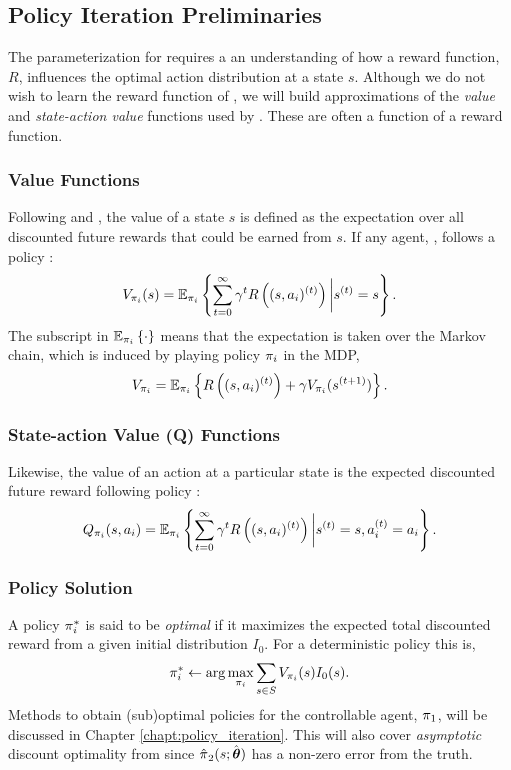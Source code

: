 \subsection{Policy Iteration Preliminaries}\label{sec:policy_iteration_preliminaries}
    The parameterization for  requires a an understanding of how a reward function, $R$, influences the
    optimal action distribution at a state $s$. Although we do not wish to learn the reward function of , we
    will build approximations of the \textit{value} and \textit{state-action value} functions used by . These
    are often a function of a reward function.

\subsubsection{Value Functions}
    Following \cite{hernandez2012adaptive} and \cite{Sugiyama2015StatisticalRL}, the value of a state $s$ is defined as
    the expectation over all discounted future rewards that could be earned from $s$. If any agent, , follows a
    policy :
    \[
    V_{\pi_{i}}(s) = \mathbb{E}_{\pi_{i}}\left\{\sum_{t=0}^{\infty} \gamma^t R\left((s,a_i)^{(t)}\right)
        \bigg|s^{(t)}=s\right\}.
    \]
    The subscript in $\mathbb{E}_{\pi_{i}}\left\{\cdot\right\}$ means that the expectation is taken over the Markov chain, which
    is induced by  playing policy $\pi_{i}$ in the \ac{MDP},
    \[
    V_{\pi_{i}} = \mathbb{E}_{\pi_{i}}\left\{R\left((s,a_i)^{(t)}\right) + \gamma V_{\pi_{i}}(s^{(t+1)})\right\}.
    \]

\subsubsection{State-action Value (Q) Functions}
    Likewise, the value of an action at a particular state is the expected discounted future reward following policy
    :
    \[
    Q_{\pi_{i}}(s,a_i) = \mathbb{E}_{\pi_{i}}\left\{\sum_{t=0}^{\infty} \gamma^t R\left((s,a_i)^{(t)}\right)
        \bigg|s^{(t)}=s, a_i^{(t)}=a_i\right\}.
    \]

\subsubsection{Policy Solution}
    A policy $\pi_{i}^*$ is said to be \textit{optimal} if it maximizes the expected total discounted reward
    from a given initial distribution $I_0$. For a deterministic policy this is,
    \[
    \pi_{i}^* \leftarrow \arg\max_{\pi_{i}}\sum_{s\in S} V_{\pi_{i}}(s)I_0(s) .
    \]
    Methods to obtain (sub)optimal policies for the controllable agent, $\pi_{1}$, will be discussed in Chapter
    \ref{chapt:policy_iteration}. This will also cover \textit{asymptotic} discount optimality from
    \cite{hernandez2012adaptive} since $\hat{\pi_{}}_2(s;\hat{\boldsymbol{\mathbb{\theta}}})$ has a non-zero error from the
    truth.

